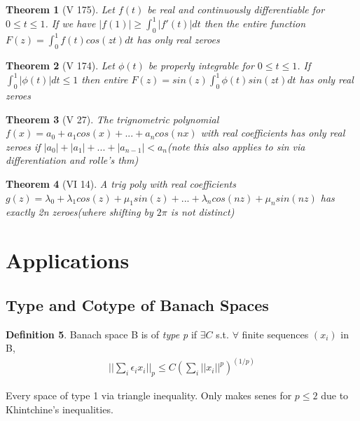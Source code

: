 \documentclass[10pt]{article}
\newcommand{\1}{\textbf{1}}
\newcommand{\norm}[1]{||#1||}
\newtheorem{theorem}{Theorem}
\theoremstyle{remark}
\theoremstyle{definition}
\newtheorem{defn}[theorem]{Definition}
\begin{document}
\begin{theorem}[V 175] \label{175}
	Let $f(t)$ be real and continuously differentiable for $0 \leq t \leq 1$. If we have $|f(1)| \geq \int_0^1 |f'(t)| dt$ then the entire function $F(z) = \int_0^1 f(t)cos(zt)dt$ has only real zeroes
\end{theorem}

\begin{theorem}[V 174]
	Let $\phi(t)$ be properly integrable for $0 \leq t \leq 1$. If $\int_0^1 |\phi(t)| dt \leq 1$ then entire $F(z)=sin(z) \int_0^1 \phi(t) sin(zt)dt$ has only real zeroes
\end{theorem}

\begin{theorem}[V 27]
	The trignometric polynomial $f(x) = a_0 + a_1 cos(x) + ... + a_ncos(nx)$ with real coefficients has only real zeroes if $|a_0| + |a_1| + ... + |a_{n-1}| < a_n$(note this also applies to sin via differentiation and rolle's thm)
\end{theorem}

\begin{theorem}[VI 14]
	A trig poly with real coefficients $g(z) = \lambda_0 + \lambda_1 cos(z) +\mu_1sin(z) + ... + \lambda_n cos(nz)+\mu_n sin(nz)$ has exactly 2n zeroes(where shifting by $2\pi$ is not distinct)
\end{theorem}



\section{Applications}

\subsection{Type and Cotype of Banach Spaces}

\begin{defn}
	Banach space B is of \textit{type p} if $\exists C$ s.t. $\forall $ finite sequences $(x_i)$ in B,
	\begin{align*}
		\norm{\sum_i \epsilon_ix_i}_p \leq C (\sum_i \norm{x_i}^p)^{(1/p)}
	\end{align*}
\end{defn}


Every space of type 1 via triangle inequality. Only makes senes for $p \leq 2$ due to Khintchine's inequalities.%
\end{document}
